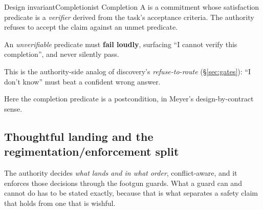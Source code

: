 \documentclass[11pt,a4paper]{article}
\theoremstyle{definition}
\theoremstyle{plain}
\begin{document}
\begin{pdclaim}{Design invariant}{Completionist Completion}
\setlength{\parskip}{4pt plus 1pt}
\label{def:completionist}
A  is a commitment whose satisfaction predicate is a
\emph{verifier} derived from the task's acceptance criteria. The authority refuses to
accept the claim against an unmet predicate.

An \emph{unverifiable} predicate must
\textbf{fail loudly}, surfacing ``I cannot verify this completion'', and never
silently pass.

This is the authority-side analog of discovery's
\emph{refuse-to-route} (\S\ref{sec:gates}): ``I don't know'' must beat a confident
wrong answer.
\end{pdclaim}



Here the completion predicate is a postcondition, in Meyer's design-by-contract
sense.


\subsection{Thoughtful landing and the regimentation/enforcement split}\label{sec:landing}

The authority decides \emph{what lands and in what order}, conflict-aware, and it
enforces those decisions through the footgun guards. What a guard can and cannot do has to be stated
exactly, because that is what separates a safety claim that holds from one
that is wishful.
\end{document}
